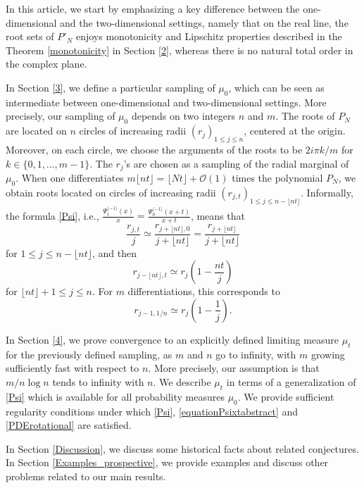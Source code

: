 \documentclass[11pt]{amsart}
\begin{document}
In this article, we start by emphasizing a key difference between the one-dimensional and the two-dimensional settings, namely that on the real line, the root sets of $P'_N$ enjoys monotonicity and Lipschitz properties described in the Theorem \ref{monotonicity} in Section \ref{2}, whereas there is no natural total order in the complex plane. 


In Section \ref{3}, we define a particular sampling of $\mu_0$, which can be seen as intermediate between one-dimensional and two-dimensional settings. 
More precisely, our sampling of $\mu_0$
depends on two integers $n$ and $m$. 
The roots of $P_N$ are located on $n$ circles of increasing radii $(r_j)_{1 \leq j \leq n}$, centered at the origin. Moreover, on each circle, we choose the arguments of the roots to be $2 i \pi k/m$ for 
$k \in \{0,1,\dots, m-1\}$. The $r_j$'s are chosen as a sampling of the radial marginal of $\mu_0$.  
When one differentiates $m \lfloor n t \rfloor
= \lfloor Nt \rfloor + \mathcal{O}(1)$ times
the polynomial $P_N$, we obtain roots 
located on circles of increasing radii
$(r_{j,t})_{1 \leq j \leq n - \lfloor nt \rfloor} $. Informally, the formula \eqref{Psi}, i.e., $\frac{ \Psi_t^{\langle -1 \rangle}(x)}{x}  =  \frac{ \Psi_0^{\langle -1 \rangle}(x+t)}{x+t} $,
means that 
$$\frac{r_{j,t}}{j}  \simeq \frac{r_{j +  \lfloor nt \rfloor, 0}}{j +  \lfloor nt \rfloor }
=\frac{r_{j +  \lfloor nt \rfloor}}{j +  \lfloor nt \rfloor } $$
for $1 \leq j \leq n - \lfloor nt \rfloor$, 
and then 
$$r_{j-\lfloor nt \rfloor ,t} \simeq r_{j} 
\left( 1 - \frac{nt}{j} \right)$$
for $\lfloor nt \rfloor + 1 \leq j \leq n$. 
For $m$ differentiations, this corresponds to 
$$r_{j-1,1/n} \simeq r_{j} \left(1 - \frac{1}{j} \right).$$

In Section \ref{4}, we prove convergence to an explicitly defined limiting measure $\mu_t$ for the previously defined sampling, as $m$ and $n$ go to infinity, with $m$ growing sufficiently fast with respect to $n$.  More precisely, our assumption is that $m / n \log n$ tends to infinity with $n$. We
describe $\mu_t$ in terms of a generalization of \eqref{Psi} which is available for all probability measures $\mu_0$. We provide sufficient regularity conditions under which \eqref{Psi}, \eqref{equationPsixtabstract} and \eqref{PDErotational} are satisfied. 

In Section \ref{Discussion}, we discuss some historical facts about related conjectures. 
In Section \ref{Examples_prospective}, we provide examples and discuss other problems related to our main results. 
\end{document}
